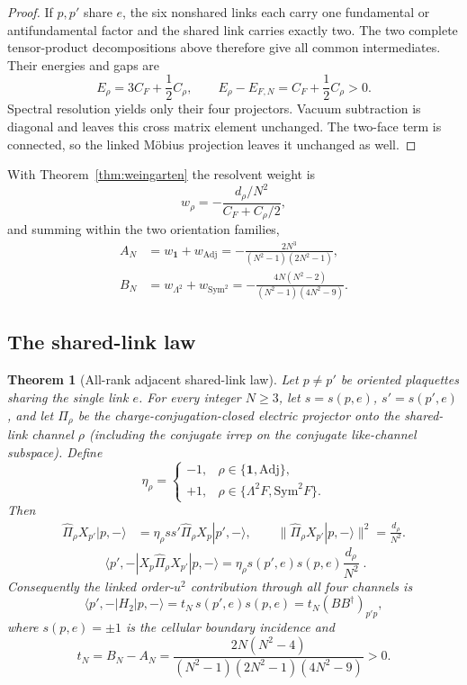 \documentclass[11pt]{article}
\theoremstyle{plain}
\newtheorem{theorem}{Theorem}
\theoremstyle{definition}
\theoremstyle{remark}
\newcommand{\chk}[1]{}
\newcommand{\CF}{C_F}
\newcommand{\dg}{^{\dagger}}
\begin{document}
\begin{proof}
If $p,p'$ share $e$, the six nonshared links each carry one fundamental or
antifundamental factor and the shared link carries exactly two. The two
complete tensor-product decompositions above therefore give all common
intermediates. Their energies and gaps are
\[
 E_\rho=3\CF+\frac12C_\rho,\qquad
 E_\rho-E_{F,N}=\CF+\frac12C_\rho>0 .
\]
Spectral resolution yields only their four projectors. Vacuum subtraction is
diagonal and leaves this cross matrix element unchanged. The two-face term is
connected, so the linked M\"obius projection leaves it unchanged as well.
\end{proof}
\chk{second-order off-diagonal processes are exactly the adjacent shared-link channels}

With Theorem~\ref{thm:weingarten} the resolvent weight is
\begin{equation}\label{eq:w}
  w_\rho=-\frac{d_\rho/N^2}{\CF+C_\rho/2},
\end{equation}
and summing within the two orientation families,
\begin{align}
  A_N&=w_{\mathbf 1}+w_{\mathrm{Adj}}=-\frac{2N^3}{(N^2-1)(2N^2-1)},\label{eq:AN}\\
  B_N&=w_{\Lambda^2}+w_{\mathrm{Sym}^2}=-\frac{4N(N^2-2)}{(N^2-1)(4N^2-9)}.\label{eq:BN}
\end{align}
\chk{the four channel weights follow from dimension and Casimir}
\chk{A\_N and B\_N are the channel sums, not transcriptions}

\subsection{The shared-link law}

\begin{theorem}[All-rank adjacent shared-link law]\label{thm:allrank}
Let $p\ne p'$ be oriented plaquettes sharing the single link $e$. For every
integer $N\ge3$, let $s=s(p,e)$, $s'=s(p',e)$, and let
$\widehat\Pi_\rho$ be the charge-conjugation-closed electric projector onto
the shared-link channel $\rho$ (including the conjugate irrep on the
conjugate like-channel subspace). Define
\[
 \eta_\rho=
 \begin{cases}
 -1,&\rho\in\{\mathbf1,\mathrm{Adj}\},\\
 +1,&\rho\in\{\Lambda^2F,\mathrm{Sym}^2F\}.
 \end{cases}
\]
Then
\begin{align}
 \widehat\Pi_\rho X_{p'}|p,-\rangle
 &=\eta_\rho ss'\widehat\Pi_\rho X_p|p',-\rangle,
 \qquad
 \bigl\|\widehat\Pi_\rho X_{p'}|p,-\rangle\bigr\|^2
 =\frac{d_\rho}{N^2}.\label{eq:projected-route}
\end{align}
\begin{equation}\label{eq:projector-cross}
 \boxed{\;
 \langle p',-|X_p\widehat\Pi_\rho X_{p'}|p,-\rangle
 =\eta_\rho s(p',e)s(p,e)\frac{d_\rho}{N^2}
 \;} .
\end{equation}
Consequently the linked order-$u^2$ contribution through all four channels is
\[
  \langle p',-|H_2|p,-\rangle
  =t_N\,s(p',e)s(p,e)
  =t_N(BB\dg)_{p'p},
\]
where $s(p,e)=\pm1$ is the cellular boundary incidence and
\[
  t_N=B_N-A_N=\frac{2N(N^2-4)}{(N^2-1)(2N^2-1)(4N^2-9)}>0 .
\]
\end{theorem}
\end{document}

